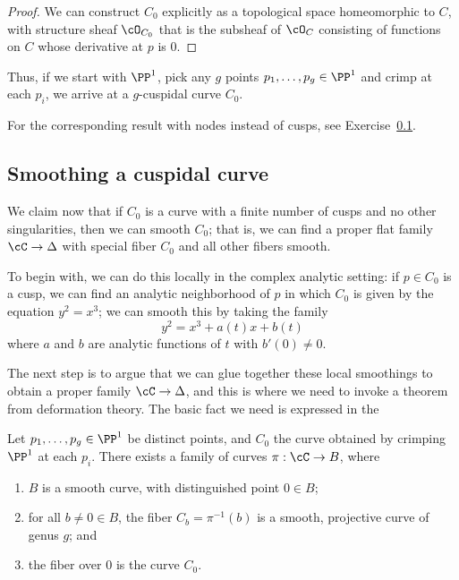 \begin{proof}
We can construct $C_0$ explicitly as a topological space homeomorphic to $C$, with structure sheaf $\cO_{C_0}$ that is
the subsheaf of $\cO_C$ consisting of functions on $C$ whose derivative at $p$ is 0.
\end{proof}

Thus, if we start with $\PP^1$, pick any $g$ points $p_1,\dots, p_g \in \PP^1$ and crimp at each $p_i$, we arrive at a $g$-cuspidal curve $C_0$.

For the corresponding result with nodes instead of cusps, see Exercise~\ref{}. 

\subsection{Smoothing a cuspidal curve}  We claim now that if $C_0$ is a curve with a finite number of cusps and no other singularities, then we can smooth $C_0$; that is, we can find a proper flat family $\cC \to \Delta$ with special fiber $C_0$ and all other fibers smooth. 

To begin with, we can do this locally in the complex analytic setting: if $p \in C_0$ is a cusp, we can find an analytic neighborhood of $p$ in which $C_0$ is given by the equation $y^2 = x^3$; we can smooth this by taking the family
$$
y^2 = x^3 + a(t)x + b(t)
$$
where $a$ and $b$ are analytic functions of $t$ with $b'(0) \neq 0$.

The next step is to argue that we can glue together these local smoothings to obtain a proper family $\cC \to \Delta$, and this is where we need to invoke a theorem from deformation theory. The basic fact we need is expressed in the

\begin{lemma}\label{specialization to cuspidal curve}
Let $p_1,\dots,p_g \in \PP^1$ be distinct points, and $C_0$ the curve obtained by 
crimping $\PP^1$ at each $p_i$. There exists a family of curves $\pi : \cC \to B$, where
\begin{enumerate}
\item $B$ is a smooth curve, with distinguished point $0 \in B$;
\item for all $b \neq 0 \in B$, the fiber $C_b = \pi^{-1}(b)$ is a smooth, projective curve of genus $g$;  and
\item the fiber over $0$ is the curve $C_0$.
\end{enumerate}
\end{lemma}


